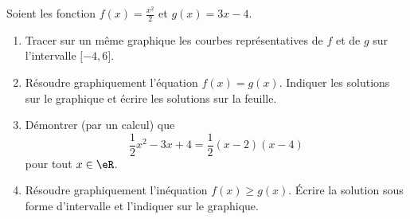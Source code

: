 
\begin{exercice}\label{exosmath-0133}

    Soient les fonction \( f(x)=\frac{ x^2 }{2}\) et \( g(x)=3x-4\).
    \begin{enumerate}
        \item
            Tracer sur un même graphique les courbes représentatives de \( f\) et de \( g\) sur l'intervalle \( \mathopen[ -4 , 6 \mathclose]\).
        \item 
            Résoudre graphiquement l'équation \( f(x)=g(x)\). Indiquer les solutions sur le graphique et écrire les solutions sur la feuille.
        \item
            Démontrer (par un calcul) que
            \begin{equation}
                \frac{ 1 }{2}x^2-3x+4=\frac{ 1 }{2}(x-2)(x-4)
            \end{equation}
            pour tout \( x\in \eR\).
        \item
            Résoudre graphiquement l'inéquation \( f(x)\geq g(x) \). Écrire la solution sous forme d'intervalle et l'indiquer sur le graphique.
    \end{enumerate}

\end{exercice}
